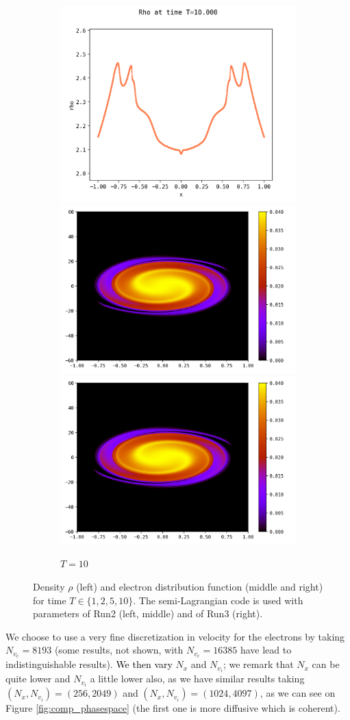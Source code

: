 \documentclass{article}
\numberwithin{equation}{section}
\newcommand{\mysubcaption}[1]{
	\vspace*{5pt}
	\begin{minipage}{0.8\linewidth}
		\begin{center}
			\footnotesize\emph{#1}
		\end{center}
	\end{minipage}
}
\newcommand{\imh}{\textheight} %
\begin{document}
\begin{figure}
	\begin{subfigure}{\textwidth}
		\centering
		\includegraphics[height=\imh,width=0.3\linewidth]{images/rhoT10.png}
		\includegraphics[height=\imh,width=0.3\linewidth]{images/feT10.png}
		\includegraphics[height=\imh,width=0.3\linewidth]{images/feT10_run_job2.png}
		\caption{$T=10$}
	\end{subfigure}


	\caption{Density $\rho$ (left) and electron distribution function (middle and right) for time $T\in \{1,2,5,10\}$. 
	 The semi-Lagrangian code is used with parameters of Run2 (left, middle) and of Run3 (right).
	}
	\label{fig:comp_temps}
\end{figure}  


We choose to use a very fine discretization in velocity for the electrons by taking $N_{v_e}=8193$ (some results, not shown, with $N_{v_e}=16385$ have lead to indistinguishable results).
\textcolor{black}{We then vary} $N_x$ and $N_{v_i}$; we remark that $N_x$ can be quite lower and $N_{v_i}$ a little lower also, as we have similar results taking $(N_x,N_{v_i})=(256,2049)$ and 
$(N_x,N_{v_i})=(1024,4097)$, as we can see on Figure \ref{fig:comp_phasespace} (the first one is more diffusive which is coherent). 
\end{document}
